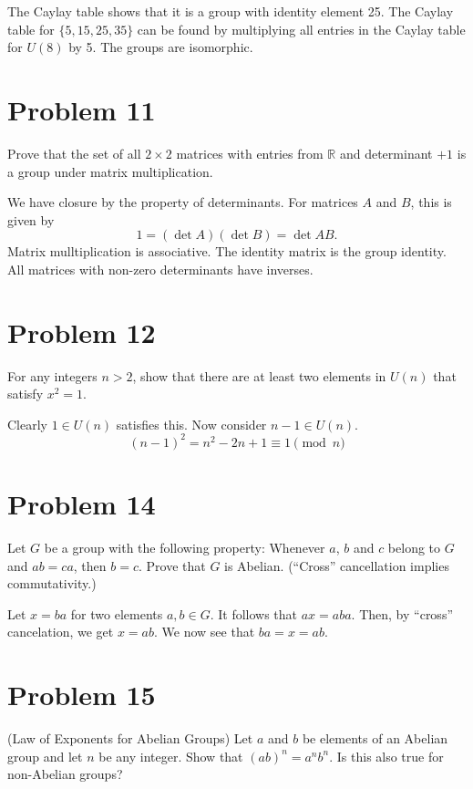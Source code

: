 \documentclass[12pt]{article}
\newcommand{\R}{\mathbb{R}}
\begin{document}
The Caylay table shows that it is a group with identity element 25.
The Caylay table for $\{5,15,25,35\}$ can be found by multiplying
all entries in the Caylay table for $U(8)$ by 5.  The groups are isomorphic.

\section*{Problem 11}

Prove that the set of all $2\times 2$ matrices with entries from $\R$ and determinant $+1$
is a group under matrix multiplication.

We have closure by the property of determinants.  For matrices $A$ and $B$, this is given by
\begin{equation*}
1 = (\det A)(\det B) = \det AB.
\end{equation*}
Matrix mulltiplication is associative.  The identity matrix is the group identity.
All matrices with non-zero determinants have inverses.

\section*{Problem 12}

For any integers $n>2$, show that there are at least two elements in $U(n)$
that satisfy $x^2=1$.

Clearly $1\in U(n)$ satisfies this.  Now consider $n-1\in U(n)$.
\begin{equation*}
(n-1)^2 = n^2-2n+1\equiv 1\pmod n
\end{equation*}

\section*{Problem 14}

Let $G$ be a group with the following property: Whenever $a$, $b$ and $c$
belong to $G$ and $ab=ca$, then $b=c$.  Prove that $G$ is Abelian.
(``Cross'' cancellation implies commutativity.)

Let $x=ba$ for two elements $a,b\in G$.  It follows that $ax=aba$.
Then, by ``cross'' cancelation, we get $x=ab$.  We now see
that $ba=x=ab$.

\section*{Problem 15}

(Law of Exponents for Abelian Groups)  Let $a$ and $b$ be elements of an
Abelian group and let $n$ be any integer.  Show that $(ab)^n=a^nb^n$.
Is this also true for non-Abelian groups?
\end{document}
